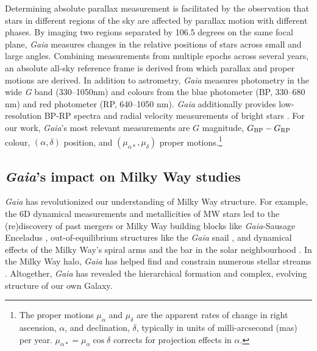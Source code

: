 Determining absolute parallax measurement is facilitated by the
observation that stars in different regions of the sky are affected by
parallax motion with different phases. By imaging two regions separated
by 106.5 degrees on the same focal plane, \emph{Gaia} measures changes
in the relative positions of stars across small and large angles.
Combining measurements from multiple epochs across several years, an
absolute all-sky reference frame is derived from which parallax and
proper motions are derived. In addition to astrometry, \emph{Gaia}
measures photometry in the wide \emph{G} band (330--1050nm) and colours
from the blue photometer (BP, 330--680 nm) and red photometer (RP,
640--1050 nm). \emph{Gaia} additionally provides low-resolution BP-RP
spectra and radial velocity measurements of bright stars \citep[of
magnitudes \(G_{\rm RVS} < 16\),][]{gaiacollaboration+2016}. For our
work, \emph{Gaia}'s most relevant measurements are \(G\) magnitude,
\(G_{\rm BP} - G_{\rm RP}\) colour, \((\alpha, \delta)\) position, and
\((\mu_{\alpha*}, \mu_\delta)\) proper motions.\footnote{The proper
  motions \(\mu_\alpha\) and \(\mu_\delta\) are the apparent rates of
  change in right ascension, \(\alpha\), and declination, \(\delta\),
  typically in units of milli-arcsecond (mas) per year.
  \(\mu_{\alpha*} = \mu_\alpha \cos \delta\) corrects for projection
  effects in \(\alpha\).}

\subsection{\texorpdfstring{\emph{Gaia}'s impact on Milky Way
studies}{Gaia's impact on Milky Way studies}}\label{gaias-impact-on-milky-way-studies}

\emph{Gaia} has revolutionized our understanding of Milky Way structure.
For example, the 6D dynamical measurements and metallicities of MW stars
led to the (re)discovery of past mergers or Milky Way building blocks
like \emph{Gaia}-Sausage Enceladus
\citetext{\citealp[e.g.,][]{helmi+2018}; \citealp{belokurov+2018}; \citealp[but
see also][]{meza+2005}}, out-of-equilibrium structures like the
\emph{Gaia} snail \citep[e.g.,][]{antoja+2018}, and dynamical effects of
the Milky Way's spiral arms and the bar in the solar neighbourhood
\citep[ and references therein]{hunt+vasiliev2025}. In the Milky Way
halo, \emph{Gaia} has helped find and constrain numerous stellar streams
\citep{ibata+malhan+martin2019, bonaca+price-whelan2025}. Altogether,
\emph{Gaia} has revealed the hierarchical formation and complex,
evolving structure of our own Galaxy.

